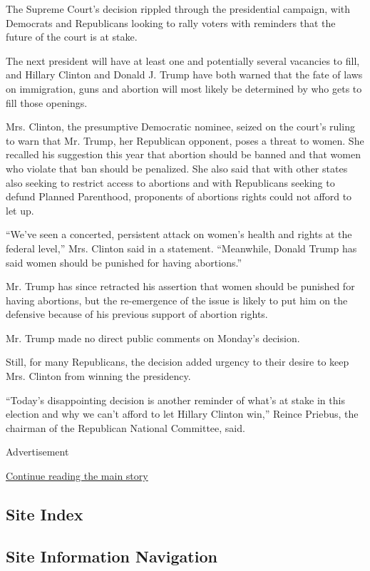 The Supreme Court's decision rippled through the presidential campaign,
with Democrats and Republicans looking to rally voters with reminders
that the future of the court is at stake.

The next president will have at least one and potentially several
vacancies to fill, and Hillary Clinton and Donald J. Trump have both
warned that the fate of laws on immigration, guns and abortion will most
likely be determined by who gets to fill those openings.

Mrs. Clinton, the presumptive Democratic nominee, seized on the court's
ruling to warn that Mr. Trump, her Republican opponent, poses a threat
to women. She recalled his suggestion this year that abortion should be
banned and that women who violate that ban should be penalized. She also
said that with other states also seeking to restrict access to abortions
and with Republicans seeking to defund Planned Parenthood, proponents of
abortions rights could not afford to let up.

``We've seen a concerted, persistent attack on women's health and rights
at the federal level,'' Mrs. Clinton said in a statement. ``Meanwhile,
Donald Trump has said women should be punished for having abortions.''

Mr. Trump has since retracted his assertion that women should be
punished for having abortions, but the re-emergence of the issue is
likely to put him on the defensive because of his previous support of
abortion rights.

Mr. Trump made no direct public comments on Monday's decision.

Still, for many Republicans, the decision added urgency to their desire
to keep Mrs. Clinton from winning the presidency.

``Today's disappointing decision is another reminder of what's at stake
in this election and why we can't afford to let Hillary Clinton win,''
Reince Priebus, the chairman of the Republican National Committee, said.

Advertisement

\protect\hyperlink{after-bottom}{Continue reading the main story}

\hypertarget{site-index}{%
\subsection{Site Index}\label{site-index}}

\hypertarget{site-information-navigation}{%
\subsection{Site Information
Navigation}\label{site-information-navigation}}

